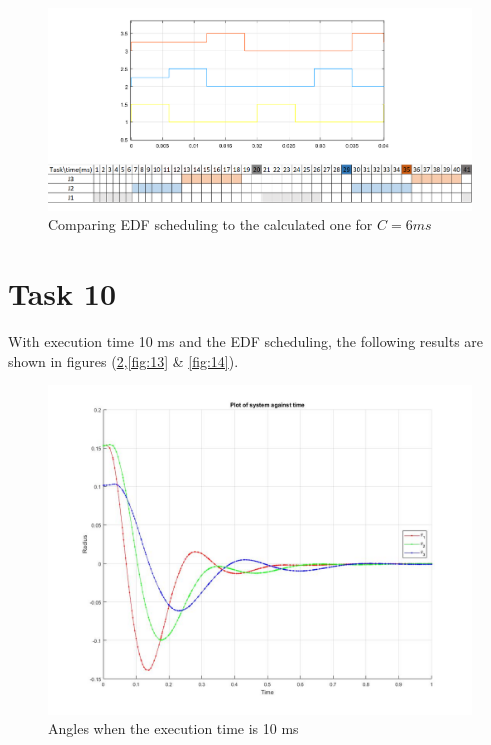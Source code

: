 \documentclass[a4paper,12pt,oneside,onecolumn]{article} %
\begin{document}
\begin{figure}[H]
    \centering
    \includegraphics[scale=0.65]{Task_9.png}
    \caption{Comparing EDF scheduling to the calculated one for $C=6ms$}
    \label{fig:11}
\end{figure}


\section*{Task 10}
With execution time 10 ms and the EDF scheduling, the following results are shown in figures (\ref{fig:12},\ref{fig:13} \& \ref{fig:14}).

\begin{figure}[H]
    \centering
    \includegraphics[scale=0.35]{theta10_EDF.jpg}
    \caption{Angles when the execution time is 10 ms}
    \label{fig:12}
\end{figure}
\end{document}
